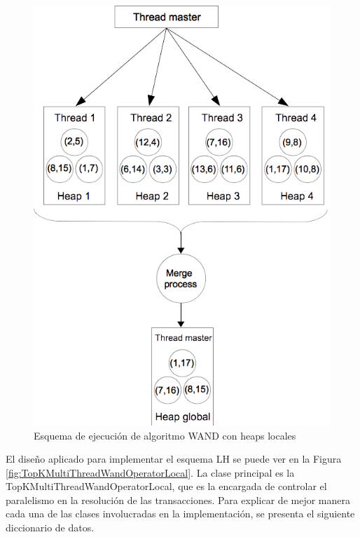 \begin{figure}[tp]
\centering
\includegraphics[scale=.75]{images/wand-heap-local.png}
\caption{Esquema de ejecución de algoritmo WAND con heaps locales}
\label{fig:wand-heap-local}
\end{figure}

El diseño aplicado para implementar el esquema LH se puede ver en la Figura \ref{fig:TopKMultiThreadWandOperatorLocal}. La clase principal es la TopKMultiThreadWandOperatorLocal, que es la encargada de controlar el paralelismo en la resolución de las transacciones. Para explicar de mejor manera cada una de las clases involucradas en la implementación, se presenta el siguiente diccionario de datos.

